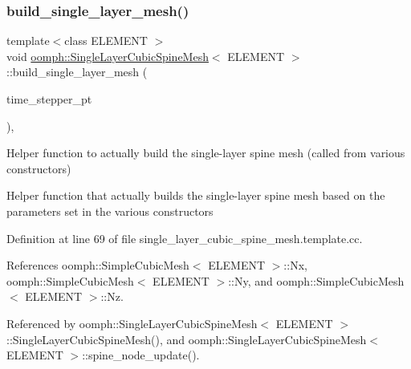 \subsubsection{\texorpdfstring{build\+\_\+single\+\_\+layer\+\_\+mesh()}{build\_single\_layer\_mesh()}}
{\footnotesize\ttfamily template$<$class E\+L\+E\+M\+E\+NT $>$ \\
void \hyperlink{classoomph_1_1SingleLayerCubicSpineMesh}{oomph\+::\+Single\+Layer\+Cubic\+Spine\+Mesh}$<$ E\+L\+E\+M\+E\+NT $>$\+::build\+\_\+single\+\_\+layer\+\_\+mesh (\begin{DoxyParamCaption}\item[{Time\+Stepper $\ast$}]{time\+\_\+stepper\+\_\+pt }\end{DoxyParamCaption})\hspace{0.3cm}{\ttfamily [protected]}, {\ttfamily [virtual]}}



Helper function to actually build the single-\/layer spine mesh (called from various constructors) 

Helper function that actually builds the single-\/layer spine mesh based on the parameters set in the various constructors 

Definition at line 69 of file single\+\_\+layer\+\_\+cubic\+\_\+spine\+\_\+mesh.\+template.\+cc.



References oomph\+::\+Simple\+Cubic\+Mesh$<$ E\+L\+E\+M\+E\+N\+T $>$\+::\+Nx, oomph\+::\+Simple\+Cubic\+Mesh$<$ E\+L\+E\+M\+E\+N\+T $>$\+::\+Ny, and oomph\+::\+Simple\+Cubic\+Mesh$<$ E\+L\+E\+M\+E\+N\+T $>$\+::\+Nz.



Referenced by oomph\+::\+Single\+Layer\+Cubic\+Spine\+Mesh$<$ E\+L\+E\+M\+E\+N\+T $>$\+::\+Single\+Layer\+Cubic\+Spine\+Mesh(), and oomph\+::\+Single\+Layer\+Cubic\+Spine\+Mesh$<$ E\+L\+E\+M\+E\+N\+T $>$\+::spine\+\_\+node\+\_\+update().

\mbox{\label{classoomph_1_1SingleLayerCubicSpineMesh_a4851fbaed5be21441ad4f7b7f2a660e0}} 
